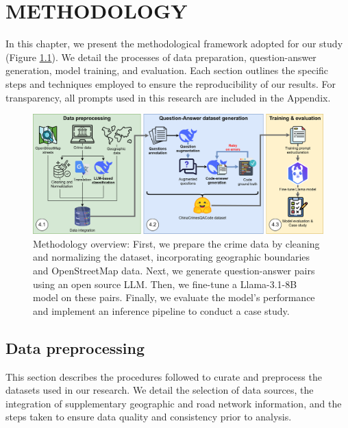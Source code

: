 \chapter{ METHODOLOGY}

\noindent
In this chapter, we present the methodological framework adopted for our study (Figure \ref{fig:methodology_overview}). We detail the processes of data preparation, question-answer generation, model training, and evaluation. Each section outlines the specific steps and techniques employed to ensure the reproducibility of our results. For transparency, all prompts used in this research are included in the Appendix.


\begin{figure}[hbtp]
  \centering
  \includegraphics[width=\textwidth]{images/metodologiaExtended.png}
  \captionsetup{justification=raggedright,singlelinecheck=false}
  \caption{Methodology overview: First, we prepare the crime data by cleaning and normalizing the dataset, incorporating geographic boundaries and OpenStreetMap data. Next, we generate question-answer pairs using an open source LLM. Then, we fine-tune a Llama-3.1-8B model on these pairs. Finally, we evaluate the model's performance and implement an inference pipeline to conduct a case study.}
  \label{fig:methodology_overview}
\end{figure}


\section{Data preprocessing}

\noindent
This section describes the procedures followed to curate and preprocess the datasets used in our research. We detail the selection of data sources, the integration of supplementary geographic and road network information, and the steps taken to ensure data quality and consistency prior to analysis.


